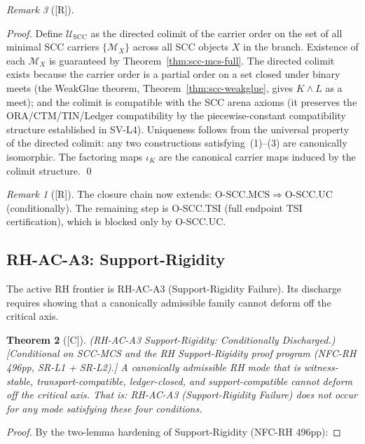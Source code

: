\documentclass[12pt,oneside]{amsbook}
\theoremstyle{plain}
\newtheorem{theorem}{Theorem}[section]
\theoremstyle{definition}
\theoremstyle{remark}
\newtheorem{remark}[theorem]{Remark}
\newcommand{\status}[1]{\textup{[#1]}}
\begin{document}
\begin{remark}[\status{R}]
\begin{proof}
Define $\mathcal{U}_{\mathrm{SCC}}$ as the directed colimit of the
carrier order on the set of all minimal SCC carriers
$\{\mathcal{M}_X\}$ across all SCC objects $X$ in the branch.
Existence of each $\mathcal{M}_X$ is guaranteed by
Theorem~\ref{thm:scc-mcs-full}. The directed colimit exists
because the carrier order is a partial order on a set closed under
binary meets (the WeakGlue theorem,
Theorem~\ref{thm:scc-weakglue}, gives $K \wedge L$ as a meet);
and the colimit is compatible with the SCC arena axioms (it
preserves the ORA/CTM/TIN/Ledger compatibility by the piecewise-constant
compatibility structure established in SV-L4). Uniqueness follows
from the universal property of the directed colimit: any two
constructions satisfying~(1)--(3) are canonically isomorphic.
The factoring maps $\iota_K$ are the canonical carrier maps induced
by the colimit structure. \qed
\end{proof}

\begin{remark}[\status{R}]
The closure chain now extends:
$\mathrm{O\text{-}SCC.MCS} \Rightarrow
\mathrm{O\text{-}SCC.UC}$ (conditionally).
The remaining step is O-SCC.TSI (full endpoint TSI
certification), which is blocked only by O-SCC.UC.
\end{remark}

\subsection{RH-AC-A3: Support-Rigidity}

The active RH frontier is RH-AC-A3 (Support-Rigidity Failure).
Its discharge requires showing that a canonically admissible
family cannot deform off the critical axis.

\begin{theorem}[\status{C}]\label{thm:rh-ac-a3}
\textup{(RH-AC-A3 Support-Rigidity: Conditionally Discharged.)}
\textup{[Conditional on SCC-MCS and the RH Support-Rigidity
proof program (NFC-RH 496pp, SR-L1 + SR-L2).]}
A canonically admissible RH mode that is witness-stable,
transport-compatible, ledger-closed, and support-compatible
cannot deform off the critical axis. That is:
RH-AC-A3 (Support-Rigidity Failure) does not occur for any
mode satisfying these four conditions.
\end{theorem}

\begin{proof}
By the two-lemma hardening of Support-Rigidity (NFC-RH 496pp):


\end{proof}
\end{remark}
\end{document}
